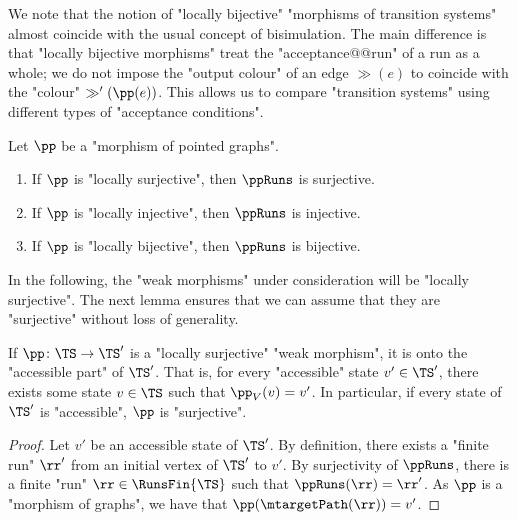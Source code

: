 \documentclass{theoretics}
\begin{document}
We note that the notion of "locally bijective" "morphisms of transition systems" almost coincide with the usual concept of bisimulation. The main difference is that "locally bijective morphisms" treat the "acceptance@@run" of a run as a whole; we do not impose the "output colour" of an edge $\gg(e)$ to coincide with the "colour" $\gg'(\pp(e))$. This allows us to compare "transition systems" using different types of "acceptance conditions".

\begin{remark}\label{rmk-morph:loc-morph-bijection-runs}
	Let $\pp$ be a "morphism of pointed graphs".
	\begin{enumerate}
		\item If $\pp$ is "locally surjective", then $\ppRuns$ is surjective.
		\item If $\pp$ is "locally injective", then $\ppRuns$ is injective.
		\item If $\pp$ is "locally bijective", then $\ppRuns$ is bijective.
	\end{enumerate}
\end{remark}



In the following, the "weak morphisms" under consideration will be "locally surjective". The next lemma ensures that we can assume that they are "surjective" without loss of generality.

\begin{lemma}\label{lemma-morph:locSurjMorph_OntoAccessible}
	If $\pp\colon \TS \to \TS'$ is a "locally surjective" "weak morphism", it is onto the "accessible part" of $\TS'$. That is, for every "accessible" state $v'\in \TS'$, there exists some state $v\in \TS$ such that $\pp_V(v)=v'$. In particular, if every state of $\TS'$ is "accessible", $\pp$ is "surjective".
\end{lemma}
\begin{proof}
	 Let $v'$ be an accessible state of $\TS'$. By definition, there exists a "finite run" $\rr'$ from an initial vertex of $\TS'$ to $v'$. By surjectivity of $\ppRuns$, there is a finite "run" $\rr\in \RunsFin{\TS}$ such that $\ppRuns(\rr) = \rr'$. As $\pp$ is a "morphism of graphs", we have that $\pp(\mtargetPath(\rr)) = v'$.
\end{proof}
\end{document}
